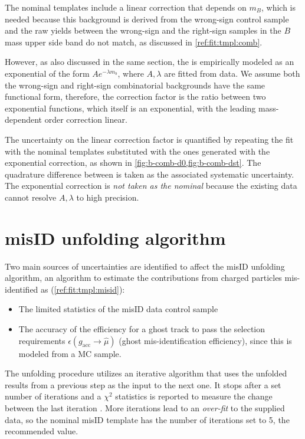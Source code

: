 The nominal \BComb templates include a linear correction that depends on $m_B$,
which is needed because this background is derived from the wrong-sign control
sample and the raw yields between the wrong-sign and the right-sign samples
in the $B$ mass upper side band do not match,
as discussed in \cref{ref:fit:tmpl:comb}.

However, as also discussed in the same section,
the \BComb is empirically modeled as an exponential of the form
$A e^{-\lambda m_b}$,
where $A, \lambda$ are fitted from data.
We assume both the wrong-sign and right-sign combinatorial backgrounds have the
same functional form,
therefore, the correction factor is the ratio between two exponential functions,
which itself is an exponential,
with the leading mass-dependent order correction linear.

The uncertainty on the linear correction factor is quantified by
repeating the fit with the nominal \BComb templates substituted with
the ones generated with the exponential correction,
as shown in
\cref{fig:b-comb-d0,fig:b-comb-dst}.
The quadrature difference between \RDX is taken as the associated systematic
uncertainty.
The exponential correction is \emph{not taken as the nominal} because the
existing data cannot resolve $A, \lambda$ to high precision.


\section{\muon misID unfolding algorithm}
\label{sys-algo-misid}

Two main sources of uncertainties are identified to affect the \muon misID
unfolding algorithm, an algorithm to estimate the contributions from charged
particles mis-identified as \muon (\cref{ref:fit:tmpl:misid}):
\begin{itemize}
    \item The limited statistics of the misID data control sample
    \item The accuracy of the efficiency for a ghost track to pass the \muon
        selection requirements $\epsilon(g_\text{acc} \rightarrow \hat{\mu})$
        (ghost mis-identification efficiency),
        since this is modeled from a MC sample.
\end{itemize}

The unfolding procedure utilizes an iterative algorithm that uses the unfolded
results from a previous step as the input to the next one.
It stops after a set number of iterations and a $\chi^2$ statistics is reported
to measure the change between the last iteration \cite{DAGOSTINI1995487}.
More iterations lead to an \emph{over-fit} to the supplied data,
so the nominal misID template has the number of iterations set to 5,
the recommended value.

